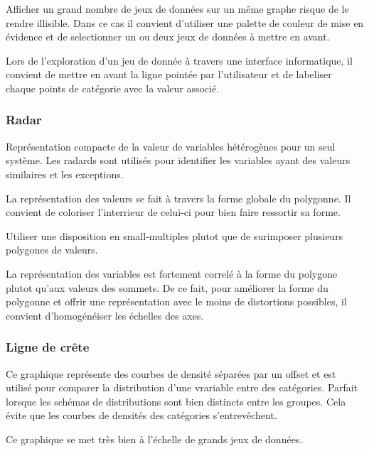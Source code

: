 \documentclass[a4paper,12pt]{article}
\begin{document}
\begin{multicols}{2}
Afficher un grand nombre de jeux de données sur un même graphe risque de le rendre illisible. \autocite{jonathanschwabishRelationship2021} Dans ce cas il convient d'utiliser une palette de couleur de mise en évidence et de selectionner un ou deux jeux de données à mettre en avant.

Lors de l'exploration d'un jeu de donnée à travers une interface informatique, il convient de mettre en avant la ligne pointée par l'utilisateur et de labeliser chaque points de catégorie avec la valeur associé. \autocite{sosulskiGraphics2019}
\subsubsection*{Radar}
\label{sec:org0a7062d}
Représentation compacte de la valeur de variables hétérogènes pour un seul système. \autocite{alansmithLexiqueVisuel} Les radards sont utilisés pour identifier les variables ayant des valeurs similaires et les exceptions. \autocite{sosulskiGraphics2019}

La représentation des valeurs se fait à travers la forme globale du polygonne. Il convient de coloriser l'interrieur de celui-ci pour bien faire ressortir sa forme. \autocite{jonathanschwabishRelationship2021}

Utiliser une disposition en small-multiples plutot que de surimposer plusieurs polygones de valeurs. \autocite{jonathanschwabishRelationship2021}

La représentation des variables est fortement correlé à la forme du polygone plutot qu'aux valeurs des sommets. \autocite{sosulskiGraphics2019} De ce fait, pour améliorer la forme du polygonne et offrir une représentation avec le moins de distortions possibles, il convient d'homogénéiser les échelles des axes.
\subsubsection*{Ligne de crête}
\label{sec:orgfa54220}
Ce graphique représente des courbes de densité séparées par un offset et est utilisé pour comparer la distribution d'une vrariable entre des catégories. \autocite{wilkeVisualizingManyDistributions2019} Parfait lorsque les schémas de distributions sont bien distincts entre les groupes. \autocite{mikeyiHowChooseRight2020} Cela évite que les courbes de densités des catégories s'entrevêchent.\autocite{jonathanschwabishDistribution2021}

Ce graphique se met très bien à l'échelle de grands jeux de données. \autocite{wilkeVisualizingManyDistributions2019}


\end{multicols}
\end{document}
